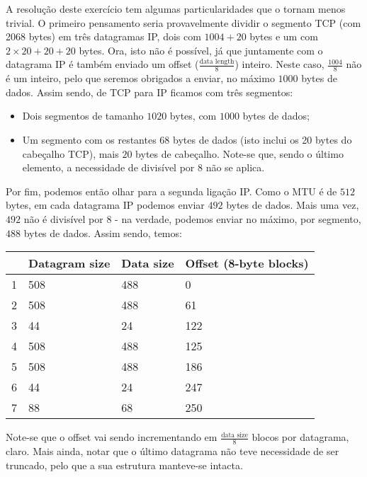 
A resolução deste exercício tem algumas particularidades que o tornam menos trivial.
O primeiro pensamento seria provavelmente dividir o segmento TCP (com 2068 bytes)
em três datagramas IP, dois com $1004 + 20$ bytes e um com $2 \times 20 + 20 + 20$ bytes.
Ora, isto não é possível, já que juntamente com o datagrama IP é também enviado um
offset ($\frac{\text{data length}}{8}$) inteiro. Neste caso, $\frac{1004}{8}$ não é um inteiro,
pelo que seremos obrigados a enviar, no máximo $1000$ bytes de dados. Assim sendo,
de TCP para IP ficamos com três segmentos:

\begin{itemize}
  \item Dois segmentos de tamanho $1020$ bytes, com $1000$ bytes de dados;
  \item Um segmento com os restantes $68$ bytes de dados (isto inclui os 20 bytes
        do cabeçalho TCP), mais $20$ bytes de cabeçalho. Note-se que, sendo o último elemento,
        a necessidade de  divisível por 8 não se aplica.
\end{itemize}

Por fim, podemos então olhar para a segunda ligação IP. Como o MTU é de $512$ bytes,
em cada datagrama IP podemos enviar $492$ bytes de dados. Mais uma vez, $492$ não
é divisível por 8 - na verdade, podemos enviar no máximo, por segmento, $488$ bytes
de dados. Assim sendo, temos:

\begin{table}[H]
  \centering
  \begin{tabular}{l|l|l|l}
      & Datagram size & Data size & Offset (8-byte blocks) \\ \hline
    1 & 508           & 488       & 0                      \\
    2 & 508           & 488       & 61                     \\
    3 & 44            & 24        & 122                    \\
    4 & 508           & 488       & 125                    \\
    5 & 508           & 488       & 186                    \\
    6 & 44            & 24        & 247                    \\
    7 & 88            & 68        & 250
  \end{tabular}
\end{table}

Note-se que o offset vai sendo incrementando em $\frac{\text{data size}}{8}$ blocos
por datagrama, claro. Mais ainda, notar que o último datagrama não teve necessidade
de ser truncado, pelo que a sua estrutura manteve-se intacta.

